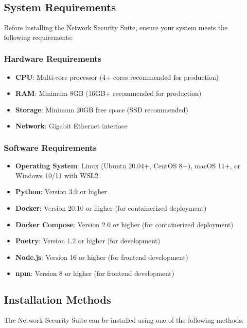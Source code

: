\subsection{System Requirements}
Before installing the Network Security Suite, ensure your system meets the following requirements:

\subsubsection{Hardware Requirements}
\begin{itemize}
    \item \textbf{CPU}: Multi-core processor (4+ cores recommended for production)
    \item \textbf{RAM}: Minimum 8GB (16GB+ recommended for production)
    \item \textbf{Storage}: Minimum 20GB free space (SSD recommended)
    \item \textbf{Network}: Gigabit Ethernet interface
\end{itemize}

\subsubsection{Software Requirements}
\begin{itemize}
    \item \textbf{Operating System}: Linux (Ubuntu 20.04+, CentOS 8+), macOS 11+, or Windows 10/11 with WSL2
    \item \textbf{Python}: Version 3.9 or higher
    \item \textbf{Docker}: Version 20.10 or higher (for containerized deployment)
    \item \textbf{Docker Compose}: Version 2.0 or higher (for containerized deployment)
    \item \textbf{Poetry}: Version 1.2 or higher (for development)
    \item \textbf{Node.js}: Version 16 or higher (for frontend development)
    \item \textbf{npm}: Version 8 or higher (for frontend development)
\end{itemize}

\subsection{Installation Methods}
The Network Security Suite can be installed using one of the following methods:

